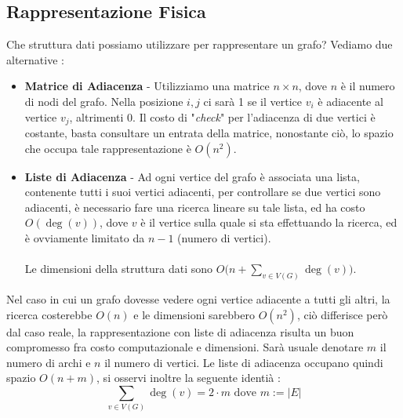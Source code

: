 \documentclass[12pt, letterpaper]{article}
\newcommand{\acc}{\\\hphantom{}\\}
\begin{document}
\subsection{Rappresentazione Fisica}
Che struttura dati possiamo utilizzare per rappresentare un grafo? Vediamo due alternative : \begin{itemize}
    \item \textbf{Matrice di Adiacenza} - Utilizziamo una matrice $n\times n$, dove \(n\) è il numero di 
    nodi del grafo. Nella posizione \(i,j\) ci sarà 1 se il vertice \(v_i\) è adiacente al vertice 
    \(v_j\), altrimenti 0. Il costo di "\textit{check}" per l'adiacenza di due vertici è costante, basta 
    consultare un entrata della matrice, nonostante ciò, lo spazio che occupa tale rappresentazione è 
    \(O(n^2)\).
    \item \textbf{Liste di Adiacenza} - Ad ogni vertice del grafo è associata una lista, contenente tutti 
    i suoi vertici adiacenti, per controllare se due vertici sono adiacenti, è necessario fare una ricerca 
    lineare su tale lista, ed ha costo $\displaystyle O(\deg(v))$, dove \(v\) è il vertice sulla 
    quale si sta effettuando la ricerca, ed è ovviamente limitato da \(n-1\) (numero di vertici).\acc
    Le dimensioni della struttura dati sono $\displaystyle O\big(n + \sum_{v\in V(G)}\deg(v)\big)$.
\end{itemize}
Nel caso in cui un grafo dovesse vedere ogni vertice adiacente a tutti gli altri, la ricerca costerebbe 
\(O(n)\) e le dimensioni sarebbero \(O(n^2)\), ciò differisce però dal caso reale, la rappresentazione con 
liste di adiacenza risulta un buon compromesso fra costo computazionale e dimensioni.
Sarà usuale denotare \(m\) il numero di archi e \(n\) il numero di vertici.
Le liste di adiacenza occupano quindi spazio $O(n+m)$,  si osservi inoltre la 
seguente identià : $$\sum_{v\in V(G)}\deg(v)=2\cdot m\text{ dove }m:=|E|$$
\end{document}
